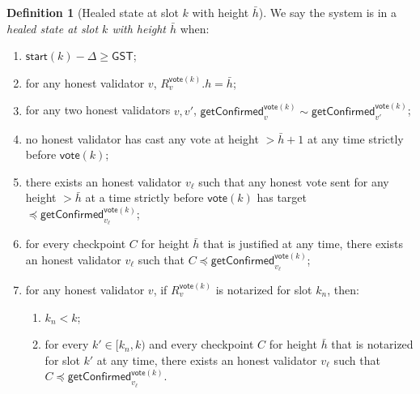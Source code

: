 \ifx\litemode\undefined\documentclass{article}\fi
\newcommand{\start}{\mathsf{start}}
\newcommand{\vote}{\mathsf{vote}}
\newcommand{\comm}[1]{\bar{#1}}
\newcommand{\getConfirmed}{\textsf{getConfirmed}\xspace}
\theoremstyle{plain}
\theoremstyle{definition}
\newtheorem{definition}[theorem]{Definition}
\theoremstyle{remark}
\newcommand{\GST}{\ensuremath{\mathsf{GST}}}
\begin{document}
\begin{definition}[Healed state at slot $k$ with height $\comm{h}$]\label{rev:def:healed-state}
We say the system is in a \emph{healed state at slot $k$ with height $\comm{h}$} when:
\begin{enumerate}
  \item\label{rev:def:healed-state:sync} $\start(k) - \Delta \geq \GST$;
  \item\label{rev:def:healed-state:R} for any honest validator $v$, $R_v^{\vote(k)}.h = \comm{h}$;
  \item\label{rev:def:healed-state:gt-compat} for any two honest validators $v, v'$, $\getConfirmed_v^{\vote(k)} \sim \getConfirmed_{v'}^{\vote(k)}$;
  \item\label{rev:def:healed-state:no-just} no honest validator has cast any vote at height $> \comm{h}+1$ at any time strictly before $\vote(k)$;
  \item\label{rev:def:healed-state:target-cap} there exists an honest validator $v_\ell$ such that any honest vote sent for any height $> \comm{h}$ at a time strictly before $\vote(k)$ has target $\preceq \getConfirmed_{v_\ell}^{\vote(k)}$;
  \item\label{rev:def:healed-state:just-bound} for every checkpoint $C$ for height $\comm{h}$ that is justified at any time, there exists an honest validator $v_\ell$ such that $C \preceq \getConfirmed_{v_\ell}^{\vote(k)}$;
  \item\label{rev:def:healed-state:notar-bound} for any honest validator $v$, if $R_v^{\vote(k)}$ is notarized for slot $k_n$, then:
  \begin{enumerate}
    \item\label{rev:def:healed-state:notar-bound:past} $k_n < k$;
    \item\label{rev:def:healed-state:notar-bound:coverage} for every $k' \in [k_n, k)$ and every checkpoint $C$ for height $\comm{h}$ that is notarized for slot $k'$ at any time, there exists an honest validator $v_\ell$ such that $C \preceq \getConfirmed_{v_\ell}^{\vote(k)}$.
  \end{enumerate}
\end{enumerate}
\end{definition}
\end{document}
